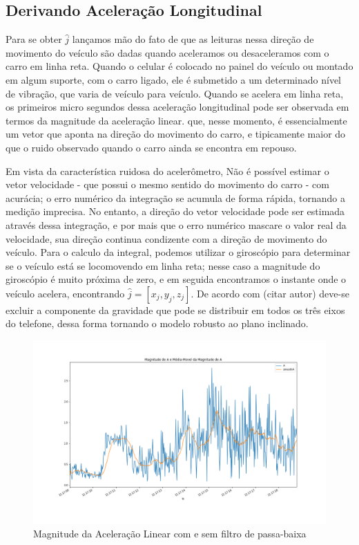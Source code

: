 \subsection{Derivando Aceleração Longitudinal}
Para se obter $\hat{j}$ lançamos mão do fato de que as leituras nessa direção de movimento do veículo são dadas quando aceleramos ou desaceleramos com o carro em linha reta. Quando o celular é colocado no painel do veículo ou montado em algum suporte, com o carro ligado, ele é submetido a um determinado nível de vibração, que varia de veículo para veículo. Quando se acelera em linha reta, os primeiros micro segundos dessa aceleração longitudinal pode ser observada em termos da magnitude da aceleração linear. que, nesse momento, é essencialmente um vetor que aponta na direção do movimento do carro, e tipicamente maior do que o ruido observado quando o carro ainda se encontra em repouso. 

Em vista da característica ruidosa do acelerômetro, Não é possível estimar o vetor velocidade - que possui o mesmo sentido do movimento do carro - com acurácia; o erro numérico da integração se acumula de forma rápida, tornando a medição imprecisa. No entanto, a direção do vetor velocidade pode ser estimada através dessa integração, e por mais que o erro numérico mascare o valor real da velocidade, sua direção continua condizente com a direção de movimento do veículo. Para o calculo da integral, podemos utilizar o giroscópio para determinar se o veículo está se locomovendo em linha reta; nesse caso a magnitude do giroscópio é muito próxima de zero, e em seguida encontramos o instante onde o veículo acelera, encontrando $\hat{j} = [x_j,y_j,z_j]$. De acordo com (citar autor) deve-se excluir a componente da gravidade que pode se distribuir em todos os três eixos do telefone, dessa forma tornando o modelo robusto ao plano inclinado.



\begin{figure}
    \centering
    \includegraphics[width=150mm]{Figuras/acelerometroMediaMovel.png}
    \caption{Magnitude da Aceleração Linear com e sem filtro de passa-baixa}
    \label{fig:acelerometroMediaMovel}
\end{figure}

